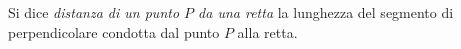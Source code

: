 % 

\begin{definizione}
Si dice \emph{distanza di un punto $P$ da una retta} la lunghezza del 
segmento di perpendicolare condotta dal punto $P$ alla retta.
\end{definizione}

